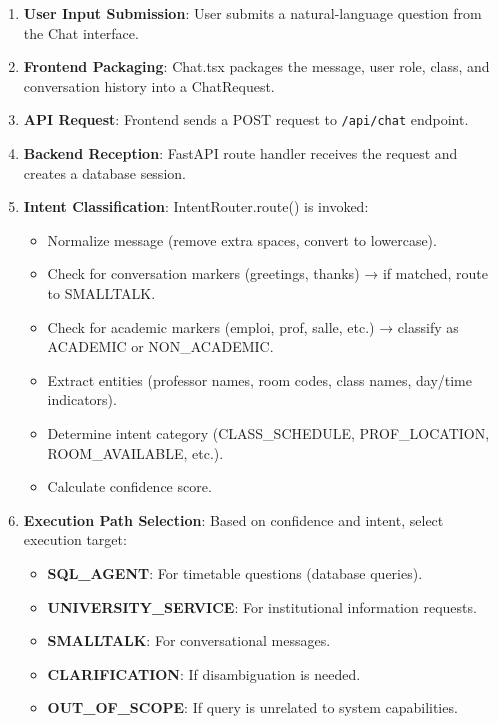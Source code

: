\begin{enumerate}
    \item \textbf{User Input Submission}: User submits a natural-language question from the Chat interface.
    
    \item \textbf{Frontend Packaging}: Chat.tsx packages the message, user role, class, and conversation history into a ChatRequest.
    
    \item \textbf{API Request}: Frontend sends a POST request to \texttt{/api/chat} endpoint.
    
    \item \textbf{Backend Reception}: FastAPI route handler receives the request and creates a database session.
    
    \item \textbf{Intent Classification}: IntentRouter.route() is invoked:
    \begin{itemize}
        \item Normalize message (remove extra spaces, convert to lowercase).
        \item Check for conversation markers (greetings, thanks) → if matched, route to SMALLTALK.
        \item Check for academic markers (emploi, prof, salle, etc.) → classify as ACADEMIC or NON\_ACADEMIC.
        \item Extract entities (professor names, room codes, class names, day/time indicators).
        \item Determine intent category (CLASS\_SCHEDULE, PROF\_LOCATION, ROOM\_AVAILABLE, etc.).
        \item Calculate confidence score.
    \end{itemize}
    
    \item \textbf{Execution Path Selection}: Based on confidence and intent, select execution target:
    \begin{itemize}
        \item \textbf{SQL\_AGENT}: For timetable questions (database queries).
        \item \textbf{UNIVERSITY\_SERVICE}: For institutional information requests.
        \item \textbf{SMALLTALK}: For conversational messages.
        \item \textbf{CLARIFICATION}: If disambiguation is needed.
        \item \textbf{OUT\_OF\_SCOPE}: If query is unrelated to system capabilities.
    \end{itemize}
    

\end{enumerate}
